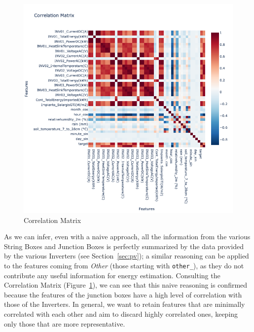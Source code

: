 \begin{figure}[H]
	\centering
	\includegraphics[width=\textwidth, keepaspectratio]{chapters/2_data_preprocessing/imgs/correlationmatrix.png}
	\caption{Correlation Matrix}\label{fig:corrmatrix}
\end{figure}
As we can infer, even with a naive approach, all the information from the various
String Boxes and Junction Boxes is perfectly summarized by the data provided by the
various Inverters (see Section~\ref{sec:pv}); a similar reasoning can be applied to the features
coming from \textit{Other} (those starting with \verb|other_|), as they do not contribute any
useful information for energy estimation. Consulting the Correlation Matrix (Figure~\ref{fig:corrmatrix}), we can
see that this naive reasoning is confirmed because the features of the junction boxes
have a high level of correlation with those of the Inverters.
In general, we want to retain features that are minimally correlated with each other
and aim to discard highly correlated ones, keeping only those that are more representative.

